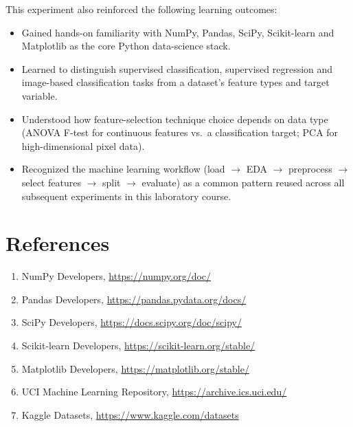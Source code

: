 \documentclass[12pt,a4paper]{article}
\begin{document}
This experiment also reinforced the following learning outcomes:
\begin{itemize}[nosep]
\item Gained hands-on familiarity with NumPy, Pandas, SciPy, Scikit-learn and Matplotlib
as the core Python data-science stack.
\item Learned to distinguish supervised classification, supervised regression and
image-based classification tasks from a dataset's feature types and target variable.
\item Understood how feature-selection technique choice depends on data type (ANOVA
F-test for continuous features vs.\ a classification target; PCA for high-dimensional
pixel data).
\item Recognized the machine learning workflow (load $\to$ EDA $\to$ preprocess $\to$
select features $\to$ split $\to$ evaluate) as a common pattern reused across all
subsequent experiments in this laboratory course.
\end{itemize}

\section{References}
\begin{enumerate}
\item NumPy Developers, \url{https://numpy.org/doc/}
\item Pandas Developers, \url{https://pandas.pydata.org/docs/}
\item SciPy Developers, \url{https://docs.scipy.org/doc/scipy/}
\item Scikit-learn Developers, \url{https://scikit-learn.org/stable/}
\item Matplotlib Developers, \url{https://matplotlib.org/stable/}
\item UCI Machine Learning Repository, \url{https://archive.ics.uci.edu/}
\item Kaggle Datasets, \url{https://www.kaggle.com/datasets}
\end{enumerate}
\end{document}
